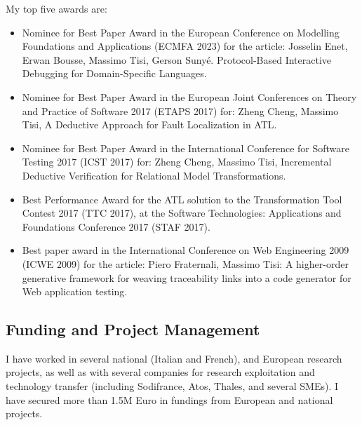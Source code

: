 \medskip
My top five awards are: 
\begin{itemize}
\item Nominee for Best Paper Award in the European Conference on Modelling Foundations and Applications (ECMFA 2023) for the article: Josselin Enet, Erwan Bousse, Massimo Tisi, Gerson Sunyé. Protocol-Based Interactive Debugging for Domain-Specific Languages.
\item Nominee for Best Paper Award in the European Joint Conferences on Theory and Practice of Software 2017 (ETAPS 2017) for: Zheng Cheng, Massimo Tisi, A Deductive Approach for Fault Localization in ATL.
\item Nominee for Best Paper Award in the International Conference for Software Testing 2017 (ICST 2017) for: Zheng Cheng, Massimo Tisi, Incremental Deductive Verification for Relational Model Transformations.
\item Best Performance Award for the ATL solution to the Transformation Tool Contest 2017 (TTC 2017), at the Software Technologies: Applications and Foundations Conference 2017 (STAF 2017).
\item Best paper award in the International Conference on Web Engineering 2009 (ICWE 2009) for the article: Piero Fraternali, Massimo Tisi: A higher-order generative framework for weaving traceability links into a code generator for Web application testing.
\end{itemize}

\subsection*{Funding and Project Management}
I have worked in several national (Italian and French), and European research projects, as well as with several companies for research exploitation and technology transfer (including Sodifrance, Atos, Thales, and several SMEs). I have secured more than 1.5M Euro in fundings from European and national projects.

